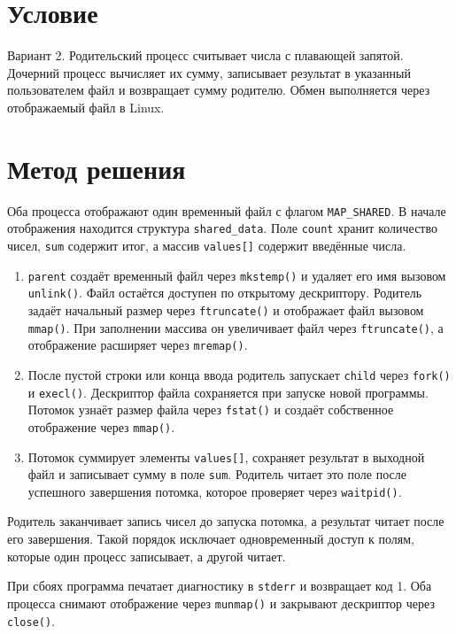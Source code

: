 \section{Условие}

Вариант 2. Родительский процесс считывает числа с плавающей запятой.
Дочерний процесс вычисляет их сумму, записывает результат в указанный пользователем
файл и возвращает сумму родителю. Обмен выполняется через отображаемый файл в Linux.

\section{Метод решения}

Оба процесса отображают один временный файл с флагом \texttt{MAP\_SHARED}.
В начале отображения находится структура \texttt{shared\_data}. Поле \texttt{count}
хранит количество чисел, \texttt{sum} содержит итог, а массив \texttt{values[]}
содержит введённые числа.

\begin{enumerate}
  \item \texttt{parent} создаёт временный файл через \texttt{mkstemp()} и удаляет
    его имя вызовом \texttt{unlink()}. Файл остаётся доступен по открытому дескриптору.
    Родитель задаёт начальный размер через \texttt{ftruncate()} и отображает файл
    вызовом \texttt{mmap()}. При заполнении массива он увеличивает файл через
    \texttt{ftruncate()}, а отображение расширяет через \texttt{mremap()}.
  \item После пустой строки или конца ввода родитель запускает \texttt{child} через
    \texttt{fork()} и \texttt{execl()}. Дескриптор файла сохраняется при запуске
    новой программы. Потомок узнаёт размер файла через \texttt{fstat()} и создаёт
    собственное отображение через \texttt{mmap()}.
  \item Потомок суммирует элементы \texttt{values[]}, сохраняет результат в
    выходной файл и записывает сумму в поле \texttt{sum}. Родитель читает это поле
    после успешного завершения потомка, которое проверяет через \texttt{waitpid()}.
\end{enumerate}

Родитель заканчивает запись чисел до запуска потомка, а результат читает после
его завершения. Такой порядок исключает одновременный доступ к полям, которые
один процесс записывает, а другой читает.

При сбоях программа печатает диагностику в \texttt{stderr} и возвращает код 1.
Оба процесса снимают отображение через \texttt{munmap()} и закрывают дескриптор
через \texttt{close()}.

